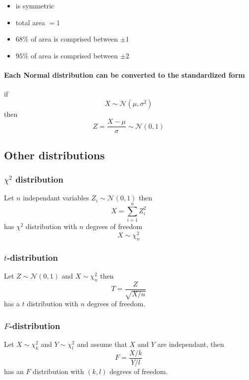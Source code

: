 \documentclass[a4paper,titlepage] {scrartcl}
\begin{document}
\begin{itemize}
	\item is symmetric
	\item total area $= 1$
	\item $68\%$ of area is comprised between $\pm 1$
	\item $95\%$ of area is comprised between $\pm 2$
\end{itemize}

\paragraph{Each Normal distribution can be converted to the standardized form} %
\label{par:each_normal_distribution_can_be_converted_to_the_standardized_form}
if
\begin{equation}
	X\sim\mathcal N(\mu, \sigma^2)
\end{equation}
  then 
\begin{equation}
	Z = \frac{X-\mu}{\sigma} \sim \mathcal N (0,1)
\end{equation}


\subsection{Other distributions}

\subsubsection{$\chi^2$ distribution}
Let $n$ independant variables $Z_i \sim \mathcal N(0,1)$ then	\begin{equation}
	X = \sum_{i=1}^nZ_i^2
\end{equation}
has $\chi^2$ distribution with $n$ degrees of freedom
\begin{equation}
	X \sim \chi_n^2
\end{equation}

\subsubsection{$t$-distribution}

Let $Z\sim\mathcal N(0,1)$ and $X\sim\chi_n^2$
then 
\begin{equation}
	T = \frac{Z}{\sqrt{X/n}}
\end{equation}
has a $t$ distribution with $n$ degrees of freedom.

\subsubsection{$F$-distribution}
Let $X\sim\chi_k^2$ and $Y\sim\chi_l^2$ and assume that $X$ and $Y$ are independant, then 
\begin{equation}
	F = \frac{X/k}{Y/l}
\end{equation}
has an $F$ distribution with $(k,l)$ degrees of freedom.
\end{document}
